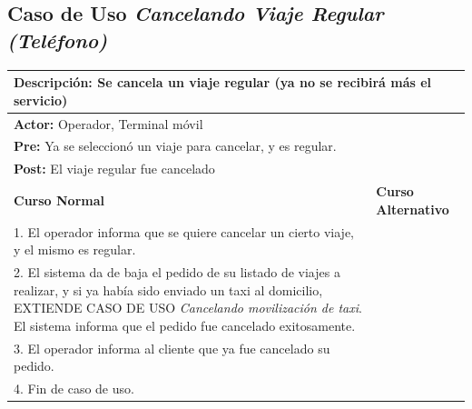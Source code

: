 \documentclass[a4paper]{article}
\begin{document}
\subsection{Caso de Uso \textit{Cancelando Viaje Regular (Tel\'efono)}}
\begin{center}
\begin{tabular}{|p{10cm} | p{6cm}|}
\hline
\multicolumn{2}{|p{16cm}|}{\textbf{Descripci\'on:} Se cancela un viaje regular (ya no se recibir\'a m\'as el servicio) } \\
\hline
\multicolumn{2}{|l|}{\textbf{Actor:} Operador, Terminal m\'ovil} \\
\hline
\multicolumn{2}{|l|}{\textbf{Pre:} Ya se seleccion\'o un viaje para cancelar, y es regular. } \\
\hline
\multicolumn{2}{|p{16cm}|}{\textbf{Post:} El viaje regular fue cancelado}\\
\hline
\textbf{Curso Normal}  & \textbf{Curso Alternativo} \\ \hline
1. El operador informa que se quiere cancelar un cierto viaje, y el mismo es regular. & \\ \hline
2. El sistema da de baja el pedido de su listado de viajes a realizar, y si ya hab\'ia sido enviado un taxi al domicilio, EXTIENDE CASO DE USO \textit{Cancelando movilizaci\'on de taxi}. El sistema informa que el pedido fue cancelado exitosamente. & \\ \hline
3. El operador informa al cliente que ya fue cancelado su pedido. & \\ \hline
4. Fin de caso de uso. & \\ \hline
\end{tabular}
\end{center}
\end{document}
